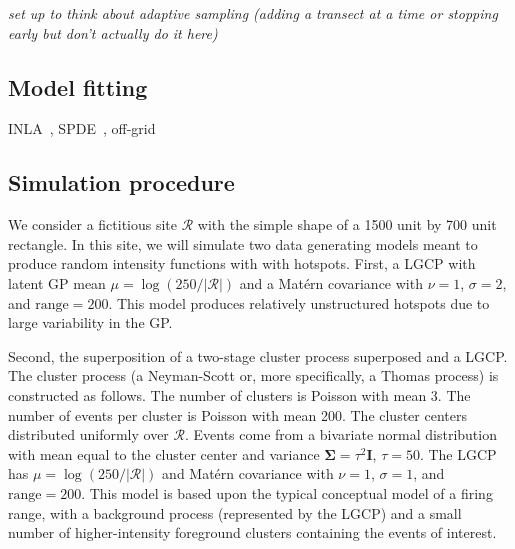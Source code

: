 \documentclass[review]{elsarticle}
\begin{document}
{\it set up to think about adaptive sampling (adding a transect at a time or
stopping early but don't actually do it here)}


\subsection{Model fitting}

INLA~\citep{rueetal}, SPDE~\citep{lindgrenetal}, off-grid~\citep{simpsonetal}


\subsection{Simulation procedure}

We consider a fictitious site \(\mathcal{R}\) with the simple shape of a 1500
unit by 700 unit rectangle. In this site, we will simulate two data generating
models meant to produce random intensity functions with with hotspots. First,
a LGCP with latent GP mean \(\mu = \log(250 / |\mathcal{R}|)\) and a
Mat\'{e}rn covariance with \(\nu = 1\), \(\sigma = 2\), and
\(\text{range} = 200\). This model produces relatively unstructured hotspots
due to large variability in the GP.

Second, the superposition of a two-stage cluster process superposed and a
LGCP. The cluster process (a Neyman-Scott or, more specifically, a Thomas
process) is constructed as follows. The number of clusters is Poisson with
mean 3. The number of events per cluster is Poisson with mean 200. The cluster
centers distributed uniformly over \(\mathcal{R}\). Events come from a
bivariate normal distribution with mean equal to the cluster center and
variance \(\boldsymbol{\Sigma} = \tau^{2}\mathbf{I}\), \(\tau = 50\). The LGCP
has \(\mu = \log(250 / |\mathcal{R}|)\) and Mat\'{e}rn covariance with
\(\nu = 1\), \(\sigma = 1\), and \(\text{range} = 200\). This model is based
upon the typical conceptual model of a firing range, with a background process
(represented by the LGCP) and a small number of higher-intensity foreground
clusters containing the events of interest.
\end{document}
